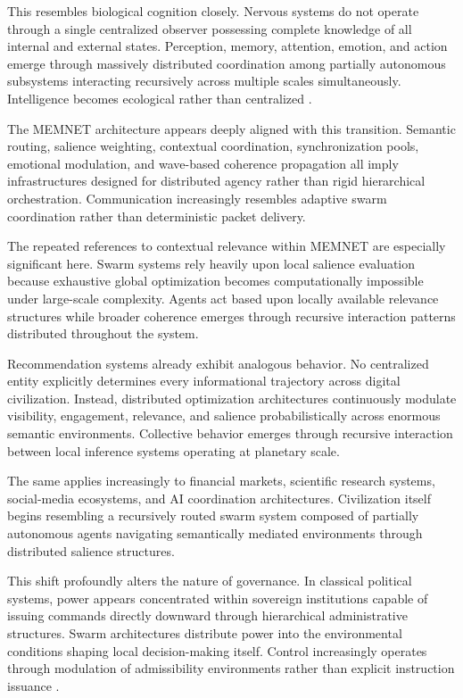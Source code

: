 \documentclass[11pt,a4paper]{article}
\begin{document}
This resembles biological cognition closely. Nervous systems do not operate through a single centralized observer possessing complete knowledge of all internal and external states. Perception, memory, attention, emotion, and action emerge through massively distributed coordination among partially autonomous subsystems interacting recursively across multiple scales simultaneously. Intelligence becomes ecological rather than centralized \cite{friston2010}.

The MEMNET architecture appears deeply aligned with this transition. Semantic routing, salience weighting, contextual coordination, synchronization pools, emotional modulation, and wave-based coherence propagation all imply infrastructures designed for distributed agency rather than rigid hierarchical orchestration. Communication increasingly resembles adaptive swarm coordination rather than deterministic packet delivery.

The repeated references to contextual relevance within MEMNET are especially significant here. Swarm systems rely heavily upon local salience evaluation because exhaustive global optimization becomes computationally impossible under large-scale complexity. Agents act based upon locally available relevance structures while broader coherence emerges through recursive interaction patterns distributed throughout the system.

Recommendation systems already exhibit analogous behavior. No centralized entity explicitly determines every informational trajectory across digital civilization. Instead, distributed optimization architectures continuously modulate visibility, engagement, relevance, and salience probabilistically across enormous semantic environments. Collective behavior emerges through recursive interaction between local inference systems operating at planetary scale.

The same applies increasingly to financial markets, scientific research systems, social-media ecosystems, and AI coordination architectures. Civilization itself begins resembling a recursively routed swarm system composed of partially autonomous agents navigating semantically mediated environments through distributed salience structures.

This shift profoundly alters the nature of governance. In classical political systems, power appears concentrated within sovereign institutions capable of issuing commands directly downward through hierarchical administrative structures. Swarm architectures distribute power into the environmental conditions shaping local decision-making itself. Control increasingly operates through modulation of admissibility environments rather than explicit instruction issuance \cite{scott1998}.
\end{document}
